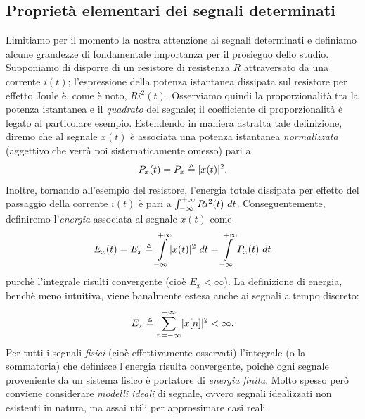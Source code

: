 \documentclass[12pt,oneside,openany]{memoir}
\numberwithin{equation}{subsection}
\DeclarePairedDelimiter{\abs}{\lvert}{\rvert}
\newcommand{\dt}{\ dt}
\begin{document}

\subsection{Propriet\`a elementari dei segnali determinati}
Limitiamo per il momento la nostra attenzione ai segnali determinati e definiamo
alcune grandezze di fondamentale importanza per il prosieguo dello studio.
Supponiamo di disporre di un resistore di resistenza $R$ attraversato da una
corrente $i(t)$; l'espressione della potenza istantanea dissipata sul resistore
per effetto Joule \`e, come \`e noto, $Ri^2(t)$. Osserviamo quindi la
proporzionalit\`a tra la potenza istantanea e il \textit{quadrato} del segnale;
il coefficiente di proporzionalit\`a \`e legato al particolare esempio.
Estendendo in maniera astratta tale definizione, diremo che al segnale $x(t)$
\`e associata una potenza istantanea \textit{normalizzata} (aggettivo che
verr\`a poi sistematicamente omesso) pari a
\begin{equation}
	P_x(t) = P_x \triangleq \abs{x(t)}^2.
\end{equation}
Inoltre, tornando all'esempio del resistore, l'energia totale dissipata per
effetto del passaggio della corrente $i(t)$ \`e pari a
$\int\displaylimits_{-\infty}^{+\infty} Ri^2(t) \dt$. Conseguentemente,
definiremo l'\textit{energia} associata al segnale $x(t)$ come
\begin{equation}
	E_x(t) = E_x \triangleq \int\displaylimits_{-\infty}^{+\infty}
	\abs{x(t)}^2 \dt = \int\displaylimits_{-\infty}^{+\infty} P_x(t) \dt
\end{equation}
purch\`e l'integrale risulti convergente (cio\`e $E_x < \infty$). La definizione
di energia, bench\`e meno intuitiva, viene banalmente estesa anche ai segnali a
tempo discreto:
\begin{equation}
	E_x \triangleq \sum_{n = -\infty}^{+\infty} \abs{x[n]}^2 < \infty.
\end{equation}
Per tutti i segnali \textit{fisici} (cio\`e effettivamente osservati)
l'integrale (o la sommatoria) che definisce l'energia risulta convergente,
poich\`e ogni segnale proveniente da un sistema fisico \`e portatore di
\textit{energia finita}. Molto spesso per\`o conviene considerare
\textit{modelli ideali} di segnale, ovvero segnali idealizzati non esistenti in
natura, ma assai utili per approssimare casi reali.\\
\end{document}
